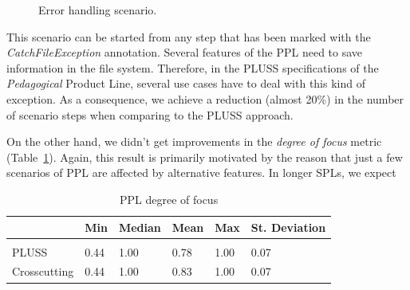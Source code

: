 \documentclass{acm_proc_article-sp}
\begin{document}
\begin{figure}[h]
\caption{Error handling scenario.}
\label{fig:error-handle}
\end{figure}

This scenario can be started from any step that has been marked with
the \emph{CatchFileException} annotation.
Several features of the PPL need to save information in the file system.
Therefore, in the PLUSS specifications of the \emph{Pedagogical}
Product Line, several use cases have to deal with this kind of exception.
As a consequence, we achieve a reduction (almost 20\%) in the number of scenario
steps when comparing to the PLUSS approach.


On the other hand, we
didn't get improvements in the \emph{degree of focus} metric
(Table~\ref{tab:ppl-dof}). Again, this result is primarily motivated by the
reason that just a few scenarios of PPL are affected by alternative features. In longer SPLs, we expect

\begin{table}[htb] \centering
\caption{PPL degree of focus}
\label{tab:ppl-dof}
\begin{small}
\begin{tabular}{llllll} \hline
					& Min 	& Median 	& Mean 	& Max 	& St. Deviation \\ \hline \\
	PLUSS			& 0.44	& 1.00		& 0.78	& 1.00	& 0.07			\\
	Crosscutting	& 0.44  & 1.00   	& 0.83 	& 1.00 	& 0.07			\\ \hline	
\end{tabular}
\end{small}
\end{table}
\end{document}
